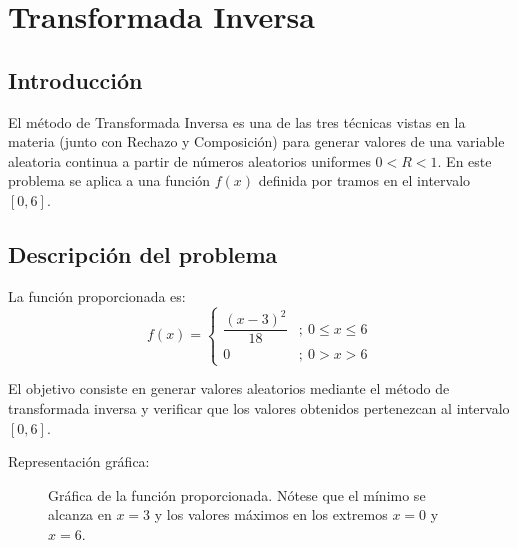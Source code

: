 \section{Transformada Inversa}

\subsection{Introducción}

El método de Transformada Inversa es una de las tres técnicas vistas en la materia (junto con Rechazo y Composición) para generar valores de una variable aleatoria continua a partir de números aleatorios uniformes $0 < R < 1$. En este problema se aplica a una función $f(x)$ definida por tramos en el intervalo $[0,6]$.

\subsection{Descripción del problema}

La función proporcionada es:
\[
f(x)=\begin{cases}\dfrac{(x-3)^2}{18} &;\ 0 \leq x \leq 6 \\ 0 &;\ 0 > x > 6\end{cases}
\]

El objetivo consiste en generar valores aleatorios mediante el método de transformada inversa y verificar que los valores obtenidos pertenezcan al intervalo $[0,6]$.

Representación gráfica:

\begingroup
{}
\begin{figure}[H]
\centering
{}
\caption{Gráfica de la función proporcionada. Nótese que el mínimo se alcanza en $x=3$ y los valores máximos en los extremos $x=0$ y $x=6$.}
\end{figure}
\endgroup

